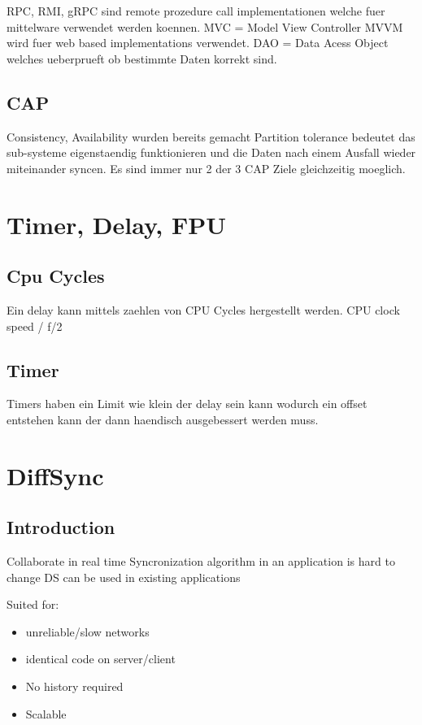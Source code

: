 RPC, RMI, gRPC sind remote prozedure call implementationen welche fuer mittelware verwendet werden koennen.
MVC = Model View Controller
MVVM wird fuer web based implementations verwendet. 
DAO = Data Acess Object welches ueberprueft ob bestimmte Daten korrekt sind.

\subsection{CAP}
Consistency, Availability wurden bereits gemacht
Partition tolerance bedeutet das sub-systeme eigenstaendig funktionieren und die Daten nach einem Ausfall wieder miteinander syncen.
Es sind immer nur 2 der 3 CAP Ziele gleichzeitig moeglich.

\section{Timer, Delay, FPU}
\subsection{Cpu Cycles}
Ein delay kann mittels zaehlen von CPU Cycles hergestellt werden.
CPU clock speed / f/2
\subsection{Timer}
Timers haben ein Limit wie klein der delay sein kann wodurch ein offset entstehen kann der dann haendisch ausgebessert werden muss.

\section{DiffSync}

\subsection{Introduction}
Collaborate in real time
Syncronization algorithm in an application is hard to change
DS can be used in existing applications

Suited for:
\begin{itemize}
    \item unreliable/slow networks
    \item identical code on server/client
    \item No history required
    \item Scalable
\end{itemize}

